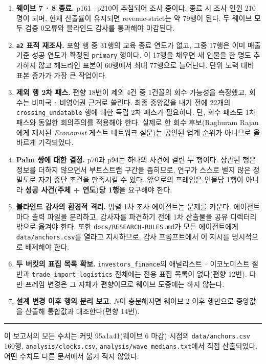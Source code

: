\documentclass[11pt]{article}
\begin{document}
\begin{enumerate}
\item \textbf{웨이브 7\,·\,8 종료.} p161\,--\,p210이 추첨되어 조사 중이다.
      종료 시 조사 인원 210명이 되며, 현재 산출률이 유지되면 revenue-strict는 약 79행이 된다.
      두 웨이브 모두 검증 0오류와 블라인드 감사를 통과해야 마감된다.

\item \textbf{\texttt{a2} 표적 재조사.} 포함 행 중 31행의 교육 종료 연도가 없고,
      그중 17행은 이미 매출 기준 성공 연도가 확정된 \texttt{primary} 행이다.
      이 17행을 채우면 새 인물을 한 명도 추가하지 않고 헤드라인 표본이 60행에서 최대 77행으로 늘어난다.
      단위 노력 대비 표본 증가가 가장 큰 작업이다.

\item \textbf{제외 행 2차 패스.} 편향 18번이 제외 4건 중 1건꼴의 회수 가능성을 측정했고,
      회수는 비미국\,·\,비영어권 근거로 쏠린다.
      최종 중앙값을 내기 전에 22개의 \texttt{crossing\_undatable} 행에 대한 독립 2차 패스가 필요하다.
      단, 회수 패스도 1차 패스와 동일한 회의주의를 적용해야 한다.
      실제로 한 회수 후보(Raghuram Rajan에게 제시된 \textit{Economist} 게스트 네트워크 설문)는
      공인된 업계 순위가 아니므로 올바르게 기각되었다.

\item \textbf{Palm 쌍에 대한 결정.} p70과 p94는 하나의 사건에 걸린 두 행이다.
      상관된 행은 정보를 더하지 않으면서 부트스트랩 구간을 좁히므로,
      연구가 스스로 벌지 않은 정밀도로 자기 중단 조건을 만족시킬 수 있다.
      앞으로의 프레임은 인물당 1행이 아니라 \textbf{성공 사건(주체 + 연도)당 1행}을 요구해야 한다.

\item \textbf{블라인드 감사의 환경적 격리.} 병렬 1차 조사 에이전트는 문제를 키운다.
      에이전트마다 출력 파일을 분리하고, 감사자를 파견하기 전에 1차 산출물을 공유 디렉터리 밖으로 옮겨야 한다.
      또한 \texttt{docs/RESEARCH-RULES.md}가 모든 에이전트에게 \texttt{data/anchors.csv}를 열라고 지시하므로,
      감사 프롬프트에서 이 지시를 명시적으로 배제해야 한다.

\item \textbf{두 버킷의 표집 목록 확보.} \texttt{investors\_finance}의 애널리스트\,·\,이코노미스트 절반과
      \texttt{trade\_import\_logistics} 전체에는 전용 표집 목록이 없다(편향 12번).
      다만 프레임 변경은 그 자체가 편향이므로 웨이브 도중에는 하지 않는다.

\item \textbf{설계 변경 이후 행의 분리 보고.} $N$이 충분해지면
      웨이브 2 이후 행만으로 중앙값을 산출해 통합값과 대조한다(편향 14번).
\end{enumerate}

\vspace{1em}
\hrule
\vspace{0.6em}
{\small
이 보고서의 모든 수치는 커밋 95a1a41(웨이브 6 마감) 시점의
\texttt{data/anchors.csv} 160행, \texttt{analysis/clocks.csv},
\texttt{analysis/wave\_medians.txt}에서 직접 산출되었다.
어떤 수치도 다른 문서에서 옮겨 적지 않았다.
}
\end{document}
